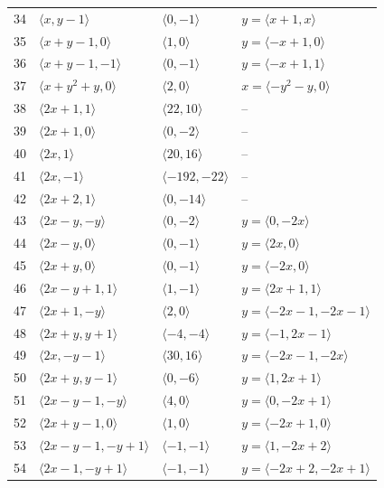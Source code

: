 \documentclass[11pt]{article}
\begin{document}
\begin{longtable}{@{}rlll@{}}
34 & $\langle x,y-1\rangle$ & $\langle 0,-1\rangle$ & $y=\langle x+1,x\rangle$\\
35 & $\langle x+y-1,0\rangle$ & $\langle 1,0\rangle$ & $y=\langle -x+1,0\rangle$\\
36 & $\langle x+y-1,-1\rangle$ & $\langle 0,-1\rangle$ & $y=\langle -x+1,1\rangle$\\
37 & $\langle x+y^{2}+y,0\rangle$ & $\langle 2,0\rangle$ & $x=\langle -y^{2}-y,0\rangle$\\
38 & $\langle 2x+1,1\rangle$ & $\langle 22,10\rangle$ & --\\
39 & $\langle 2x+1,0\rangle$ & $\langle 0,-2\rangle$ & --\\
40 & $\langle 2x,1\rangle$ & $\langle 20,16\rangle$ & --\\
41 & $\langle 2x,-1\rangle$ & $\langle -192,-22\rangle$ & --\\
42 & $\langle 2x+2,1\rangle$ & $\langle 0,-14\rangle$ & --\\
43 & $\langle 2x-y,-y\rangle$ & $\langle 0,-2\rangle$ & $y=\langle 0,-2x\rangle$\\
44 & $\langle 2x-y,0\rangle$ & $\langle 0,-1\rangle$ & $y=\langle 2x,0\rangle$\\
45 & $\langle 2x+y,0\rangle$ & $\langle 0,-1\rangle$ & $y=\langle -2x,0\rangle$\\
46 & $\langle 2x-y+1,1\rangle$ & $\langle 1,-1\rangle$ & $y=\langle 2x+1,1\rangle$\\
47 & $\langle 2x+1,-y\rangle$ & $\langle 2,0\rangle$ & $y=\langle -2x-1,-2x-1\rangle$\\
48 & $\langle 2x+y,y+1\rangle$ & $\langle -4,-4\rangle$ & $y=\langle -1,2x-1\rangle$\\
49 & $\langle 2x,-y-1\rangle$ & $\langle 30,16\rangle$ & $y=\langle -2x-1,-2x\rangle$\\
50 & $\langle 2x+y,y-1\rangle$ & $\langle 0,-6\rangle$ & $y=\langle 1,2x+1\rangle$\\
51 & $\langle 2x-y-1,-y\rangle$ & $\langle 4,0\rangle$ & $y=\langle 0,-2x+1\rangle$\\
52 & $\langle 2x+y-1,0\rangle$ & $\langle 1,0\rangle$ & $y=\langle -2x+1,0\rangle$\\
53 & $\langle 2x-y-1,-y+1\rangle$ & $\langle -1,-1\rangle$ & $y=\langle 1,-2x+2\rangle$\\
54 & $\langle 2x-1,-y+1\rangle$ & $\langle -1,-1\rangle$ & $y=\langle -2x+2,-2x+1\rangle$\\
\end{longtable}
\endgroup
\end{document}
